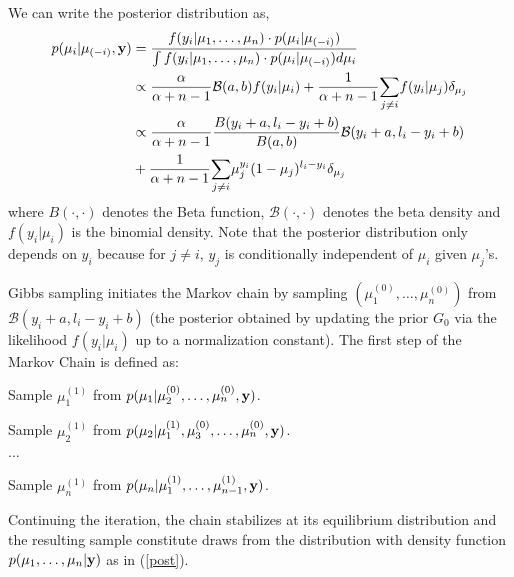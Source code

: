 \documentclass[12pt]{amsart}
\begin{document}
{We can write the posterior distribution as, 
\begin{align} \label{eq2}
p(\mu_{i} | \mu_{(-i)}, \bf{y}) & = \frac{ f(y_{i} | \mu_{1}, \dots, \mu_{n}) \cdot p( \mu_{i} | \mu_{(-i)}) }{\int f(y_{i} | \mu_{1}, \dots, \mu_{n}) \cdot p( \mu_{i} | \mu_{(-i)})  d\mu_{i}} \nonumber \\ 
& \propto  \frac{\alpha}{\alpha+n-1} \mathcal{B}(a,b) f(y_{i} | \mu_{i}) + \frac{1}{\alpha +n-1} \underset{j \neq i}{\sum} f(y_{i} | \mu_{j} ) \delta_{\mu_{j}} \nonumber \\
& \propto  \frac{\alpha}{\alpha + n-1} \frac{B(y_{i}+a, l_{i}-y_{i}+b)}{B(a, b)} \mathcal{B}(y_{i}+a, l_{i}-y_{i}+b)  \nonumber \\
& + \frac{1}{\alpha + n -1} \underset{j \neq i}{\sum} \mu_{j} ^{y_{i}}(1-\mu_{j})^{l_{i}-y_{i}} \delta_{\mu_{j}}
\end{align}
where $B(\cdot, \cdot)$ denotes the Beta function, $\mathcal{B}(\cdot, \cdot)$ denotes the 
beta density and $f(y_{i}|\mu_{i})$ is the binomial density. Note that the posterior 
distribution only depends on $y_{i}$ because for $j \neq i$, $y_{j}$ is conditionally 
independent of $\mu_{i}$ given $\mu_{j}$'s. 

Gibbs sampling initiates the Markov chain by sampling $(\mu_{1}^{(0)}, \dots, \mu_{n}^{(0)})$ 
from $\mathcal{B}(y_{i}+a, l_{i}-y_{i}+b)$ (the posterior obtained by updating the prior 
$G_{0}$ via the likelihood $f(y_{i} | \mu_{i})$ up to a normalization constant). 
The first step of the Markov Chain is defined as: 

Sample $\mu_{1}^{(1)}$ from $p(\mu_{1}| \mu_{2}^{(0)}, \dots, \mu_{n}^{(0)}, \bf{y})$. 

Sample $\mu_{2}^{(1)}$ from $p(\mu_{2} | \mu_{1}^{(1)}, \mu_{3}^{(0)}, \dots, \mu_{n}^{(0)}, 
\bf{y})$.\\ $\dots$

Sample $\mu_{n}^{(1)}$ from $p(\mu_{n} | \mu_{1}^{(1)}, \dots, \mu_{n-1}^{(1)}, \bf{y})$. 

Continuing the iteration, the chain stabilizes at its equilibrium distribution and the 
resulting sample constitute draws from the distribution with density function 
$p(\mu_{1}, \dots, \mu_{n} | \bf{y})$ as in (\ref{post}). 

}
\end{document}
